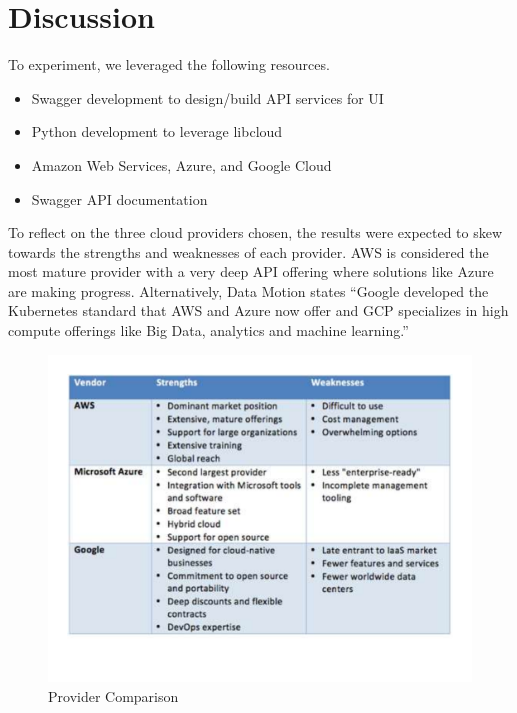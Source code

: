 \section{Discussion}

To experiment, we leveraged the following resources.

\begin{itemize}
    \item
    Swagger development to design/build API services for UI
  \item
    Python development to leverage libcloud
  \item
    Amazon Web Services, Azure, and Google Cloud
  \item
    Swagger API documentation
  \end{itemize}

To reflect on the three cloud providers chosen, the results were expected to skew towards
the strengths and weaknesses of each provider. AWS is considered the most mature provider 
with a very deep API offering where solutions like Azure are making progress. 
Alternatively, Data Motion states ``Google developed the Kubernetes standard that AWS and 
Azure now offer and GCP specializes in high compute offerings like Big Data, analytics and 
machine learning.''\cite{hid-sp18-518-DataMotion}

\begin{figure}[!ht]
  \centering
  \includegraphics[width=\columnwidth]{images/aws-azure-google.pdf}
  \caption{Provider Comparison}\label{F:comparison}
\end{figure}

